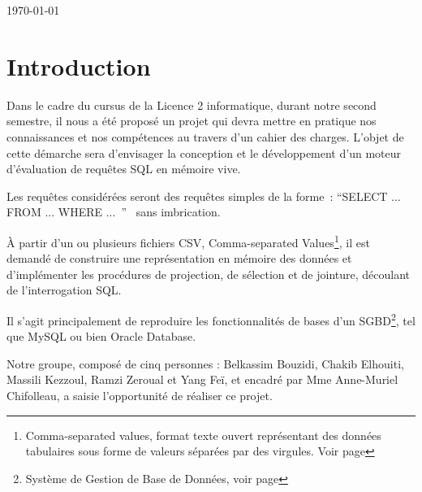 \documentclass[oneside,13pt,a4paper]{report}
\begin{document}
\begin{titlepage}
	\par\vspace{1cm}

	\vfill

	{\large \today\par}
\end{titlepage}





\parskip=5pt
\chapter*{Introduction}

Dans le cadre du cursus de la Licence 2 informatique, durant notre second semestre, il nous a été proposé un projet qui devra mettre en pratique nos connaissances et nos compétences au travers d'un cahier des charges. L’objet de cette démarche sera d’envisager la conception et le développement d'un moteur d'évaluation de requêtes SQL en mémoire vive.

Les requêtes considérées seront des requêtes simples de la forme : \enquote{SELECT ... FROM ... WHERE ... }  sans imbrication.

À partir d’un ou plusieurs fichiers CSV, Comma-separated Values\footnote{Comma-separated values, format texte ouvert représentant des données tabulaires sous forme de valeurs séparées par des virgules. Voir page \pageref{csv}},
il est demandé de construire une représentation en mémoire des données et d'implémenter les procédures de projection, de sélection et de jointure, découlant de l'interrogation SQL.

Il s'agit principalement de reproduire les fonctionnalités de bases d'un SGBD\footnote{Système de Gestion de Base de Données, voir page \pageref{sgbd}}, tel que MySQL ou bien Oracle Database.

Notre groupe, composé de cinq personnes : Belkassim Bouzidi, Chakib Elhouiti, Massili Kezzoul, Ramzi Zeroual et Yang Feï, et encadré par Mme Anne-Muriel Chifolleau, a saisie l'opportunité de réaliser ce projet.
\end{document}
